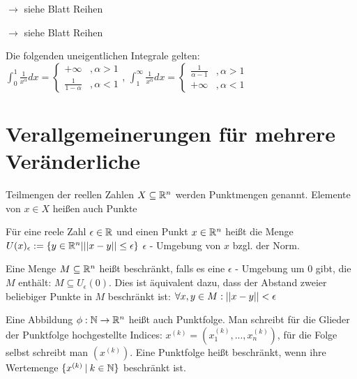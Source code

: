 \begin{satz}
	$\rightarrow$ siehe Blatt Reihen
\end{satz}

\begin{satz}
	$\rightarrow$ siehe Blatt Reihen
\end{satz}

\begin{satz}
	Die folgenden uneigentlichen Integrale gelten: \\
	$\int_{0}^{1} \frac{1}{x^\alpha} dx = 
		\begin{cases}
			+ \infty              &, \alpha > 1 \\ 
	 		\frac{1}{1 - \alpha}  &, \alpha < 1
		\end{cases}$, 
	$\int_{1}^{\infty} \frac{1}{x^\alpha} dx = 
		\begin{cases}
			\frac{1}{\alpha - 1}  &, \alpha > 1 \\
			+ \infty              &, \alpha < 1 
		\end{cases}$
\end{satz}

\pagebreak

\section{Verallgemeinerungen für mehrere Veränderliche}

\begin{definition}[Punktmenge]
	Teilmengen der reellen Zahlen $X \subseteq \mathbb{R}^n$ werden Punktmengen genannt. Elemente von $x \in X$ heißen auch Punkte

	Für eine reele Zahl $\epsilon \in \mathbb{R}$ und einen Punkt $x \in \mathbb{R}^n$ heißt die Menge $U(x)_\epsilon := \{ y \in \mathbb{R}^n | ||x - y|| \leq \epsilon \}$ $\epsilon$ - Umgebung von $x$ bzgl. der Norm.
\end{definition}

\begin{definition}[Beschränktheit]
	Eine Menge $M \subseteq \mathbb{R}^n$ heißt beschränkt, falls es eine $\epsilon$ - Umgebung um $0$ gibt, die $M$ enthält: $M \subseteq U_\epsilon(0)$. Dies ist äquivalent dazu, dass der Abstand zweier beliebiger Punkte in $M$ beschränkt ist: $\forall x,y \in M : ||x - y|| < \epsilon$
\end{definition}

\begin{definition}[Punktfolge]
	Eine Abbildung $\phi : \mathbb{N} \rightarrow \mathbb{R}^n$ heißt auch Punktfolge. Man schreibt für die Glieder der Punktfolge hochgestellte Indices: $x^{(k)} = (x_1^{(k)}, ..., x_n^{(k)})$, für die Folge selbst schreibt man $(x^{(k)})$. Eine Punktfolge heißt beschränkt, wenn ihre Wertemenge $\{ x^{(k)} \medspace |\medspace k \in \mathbb{N} \}$ beschränkt ist.
\end{definition}


